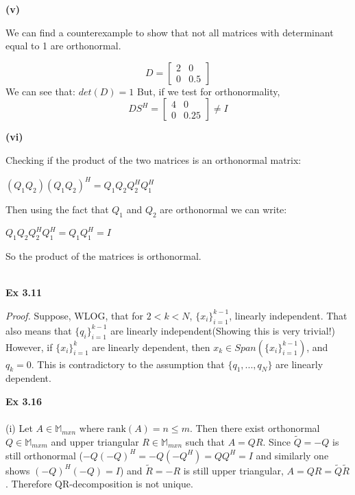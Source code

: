 \documentclass[letterpaper,12pt]{article}
\theoremstyle{definition}
\begin{document}
\begin{spacing}{1.3}{}
	\setlength{\leftskip}{10pt}
	
	\textbf{(v)}
	
	\setlength{\leftskip}{20pt}
	
	We can find a counterexample to show that not all matrices with determinant equal to 1 are orthonormal.
	
	\[D =
	\begin{bmatrix}
	2 & 0 \\
	0 & 0.5
	\end{bmatrix}
	\]
	We can see that:
	$det(D) = 1$
	But, if we test for orthonormality,
	\[DS^{H} =
	\begin{bmatrix}
	4 & 0 \\
	0 & 0.25
	\end{bmatrix} \neq I
	\]
	
	\setlength{\leftskip}{10pt}
	
	\textbf{(vi)}
	
	\setlength{\leftskip}{20pt}
	
	Checking if the product of the two matrices is an orthonormal matrix:
	
	$(Q_1Q_2)(Q_1Q_2)^H = Q_1Q_2Q_2^HQ_1^H$
	
	Then using the fact that $Q_1$ and $Q_2$ are orthonormal we can write:
	
	$Q_1Q_2Q_2^HQ_1^H = Q_1Q_1^H = I$
	
	So the product of the matrices is orthonormal. \\\\
	
	\setlength{\leftskip}{10pt}
	
	\textbf{Ex 3.11}
	
	\setlength{\leftskip}{20pt}
	
	\emph{Proof.} Suppose, WLOG, that for $2 < k < N$, $\{x_i \}_{i=1}^{k-1}$, linearly independent. That also means that $\{q_i\}_{i=1}^{k-1} $ are linearly independent(Showing this is very trivial!) \\
	However, if $\{x_i \}_{i=1}^{k}$ are linearly dependent, then $x_k \in Span(\{x_i \}_{i=1}^{k-1})$, and $q_k = 0$. This is contradictory to the assumption that $\{q_1, ..., q_N\}$ are linearly dependent.
	
	\setlength{\leftskip}{10pt}
	
	

\textbf{Ex 3.16} \\\\
	(i)
	Let $A\in\mathbb M_{mxn}$ where $\text{rank}(A)=n\leq m$.
	Then there exist orthonormal $Q\in\mathbb M_{mxm}$ and
	upper triangular $R\in\mathbb M_{mxn}$ such that $A=QR$.
	Since $\tilde{Q}=-Q$ is still orthonormal ($-Q(-Q)^H=-Q(-Q^H)=QQ^H=I$
	and similarly one shows $(-Q)^H(-Q)=I$)
	and $\tilde{R}=-R$ is still upper triangular,
	$A=QR=\tilde{Q}\tilde{R}$.
	Therefore QR-decomposition is not unique. \\\\
	

\end{spacing}
\end{document}
